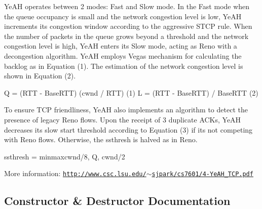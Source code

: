 Ye\+AH operates between 2 modes\+: Fast and Slow mode. In the Fast mode when the queue occupancy is small and the network congestion level is low, Ye\+AH increments its congestion window according to the aggressive S\+T\+CP rule. When the number of packets in the queue grows beyond a threshold and the network congestion level is high, Ye\+AH enters its Slow mode, acting as Reno with a decongestion algorithm. Ye\+AH employs Vegas\textquotesingle{} mechanism for calculating the backlog as in Equation (1). The estimation of the network congestion level is shown in Equation (2). \begin{DoxyVerb}                 Q = (RTT - BaseRTT) (cwnd / RTT)    (1)
                 L = (RTT - BaseRTT) / BaseRTT       (2)
\end{DoxyVerb}


To ensure T\+CP friendliness, Ye\+AH also implements an algorithm to detect the presence of legacy Reno flows. Upon the receipt of 3 duplicate A\+C\+Ks, Ye\+AH decreases its slow start threshold according to Equation (3) if it\textquotesingle{}s not competing with Reno flows. Otherwise, the ssthresh is halved as in Reno. \begin{DoxyVerb}                 ssthresh = min{max{cwnd/8, Q}, cwnd/2}
\end{DoxyVerb}


More information\+: \href{http://www.csc.lsu.edu/~sjpark/cs7601/4-YeAH_TCP.pdf}{\tt http\+://www.\+csc.\+lsu.\+edu/$\sim$sjpark/cs7601/4-\/\+Ye\+A\+H\+\_\+\+T\+C\+P.\+pdf} 

\subsection{Constructor \& Destructor Documentation}
